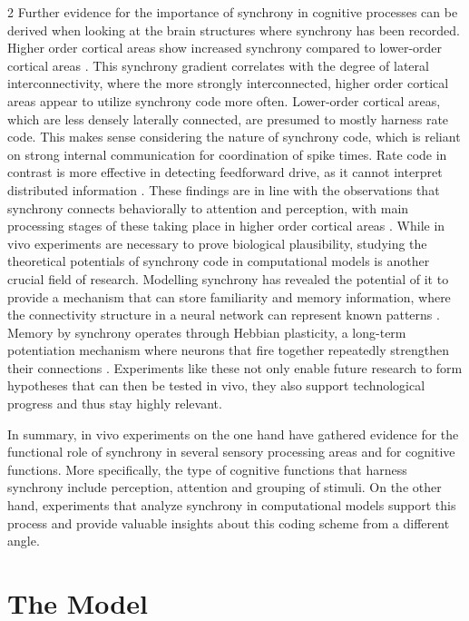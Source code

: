 \documentclass[12pt,a4paper]{article}
\begin{document}
\begin{multicols}{2}
            Further evidence for the importance of synchrony in cognitive processes can be derived when looking at the brain structures where synchrony has been recorded. Higher order cortical areas show increased synchrony compared to lower-order cortical areas \cite{L, G}. This synchrony gradient correlates with the degree of lateral interconnectivity, where the more strongly interconnected, higher order cortical areas appear to utilize synchrony code more often.
            Lower-order cortical areas, which are less densely laterally connected, are presumed to mostly harness rate code. This makes sense considering the nature of synchrony code, which is reliant on strong internal communication for coordination of spike times. Rate code in contrast is more effective in detecting feedforward drive, as it cannot interpret distributed information \cite{L}. These findings are in line with the observations that synchrony connects behaviorally to attention and perception, with main processing stages of these taking place in higher order cortical areas \cite{G}.
            While in vivo experiments are necessary to prove biological plausibility, studying the theoretical potentials of synchrony code in computational models is another crucial field of research. Modelling synchrony has revealed the potential of it to provide a mechanism that can store familiarity and memory information, where the connectivity structure in a neural network can represent known patterns \cite{L, M}. Memory by synchrony operates through Hebbian plasticity, a long-term potentiation mechanism where neurons that fire together repeatedly strengthen their connections \cite{A, L}. Experiments like these not only enable future research to form hypotheses that can then be tested in vivo, they also support technological progress and thus stay highly relevant.
            
            In summary, in vivo experiments on the one hand have gathered evidence for the functional role of synchrony in several sensory processing areas and for cognitive functions. More specifically, the type of cognitive functions that harness synchrony include perception, attention and grouping of stimuli. On the other hand, experiments that analyze synchrony in computational models support this process and provide valuable insights about this coding scheme from a different angle.
        
        \columnbreak
        \section{The Model}

\end{multicols}
\end{document}
